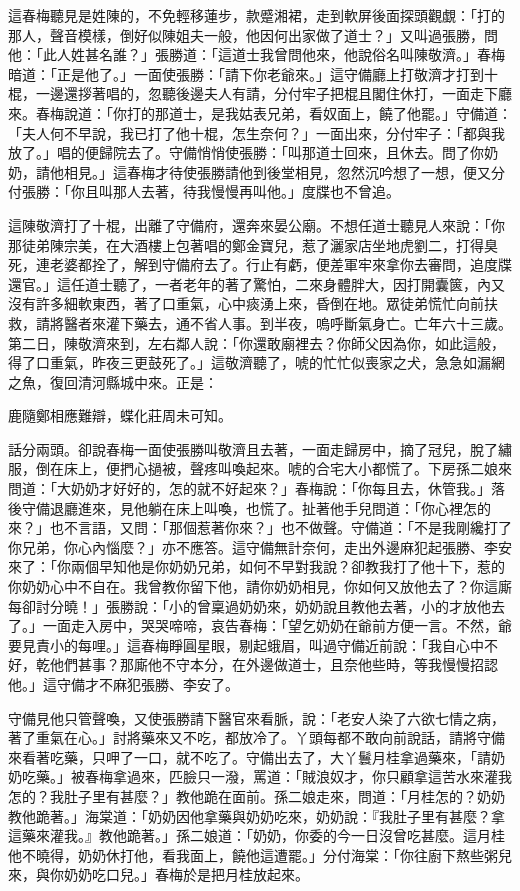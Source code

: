 這春梅聽見是姓陳的，不免輕移蓮步，款蹙湘裙，走到軟屏後面探頭觀覷：「打的那人，聲音模樣，倒好似陳姐夫一般，他因何出家做了道士？」又叫過張勝，問他：「此人姓甚名誰？」張勝道：「這道士我曾問他來，他說俗名叫陳敬濟。」春梅暗道：「正是他了。」一面使張勝：「請下你老爺來。」這守備廳上打敬濟才打到十棍，一邊還拶著唱的，忽聽後邊夫人有請，分付牢子把棍且閣住休打，一面走下廳來。春梅說道：「你打的那道士，是我姑表兄弟，看奴面上，饒了他罷。」守備道：「夫人何不早說，我已打了他十棍，怎生奈何？」一面出來，分付牢子：「都與我放了。」唱的便歸院去了。守備悄悄使張勝：「叫那道士回來，且休去。問了你奶奶，請他相見。」這春梅才待使張勝請他到後堂相見，忽然沉吟想了一想，便又分付張勝：「你且叫那人去著，待我慢慢再叫他。」度牒也不曾追。

這陳敬濟打了十棍，出離了守備府，還奔來晏公廟。不想任道士聽見人來說：「你那徒弟陳宗美，在大酒樓上包著唱的鄭金寶兒，惹了灑家店坐地虎劉二，打得臭死，連老婆都拴了，解到守備府去了。行止有虧，便差軍牢來拿你去審問，追度牒還官。」這任道士聽了，一者老年的著了驚怕，二來身體胖大，因打開囊篋，內又沒有許多細軟東西，著了口重氣，心中痰湧上來，昏倒在地。眾徒弟慌忙向前扶救，請將醫者來灌下藥去，通不省人事。到半夜，嗚呼斷氣身亡。亡年六十三歲。第二日，陳敬濟來到，左右鄰人說：「你還敢廟裡去？你師父因為你，如此這般，得了口重氣，昨夜三更鼓死了。」這敬濟聽了，唬的忙忙似喪家之犬，急急如漏網之魚，復回清河縣城中來。正是：

鹿隨鄭相應難辯，蝶化莊周未可知。

話分兩頭。卻說春梅一面使張勝叫敬濟且去著，一面走歸房中，摘了冠兒，脫了繡服，倒在床上，便捫心撾被，聲疼叫喚起來。唬的合宅大小都慌了。下房孫二娘來問道：「大奶奶才好好的，怎的就不好起來？」春梅說：「你每且去，休管我。」落後守備退廳進來，見他躺在床上叫喚，也慌了。扯著他手兒問道：「你心裡怎的來？」也不言語，又問：「那個惹著你來？」也不做聲。守備道：「不是我剛纔打了你兄弟，你心內惱麼？」亦不應答。這守備無計奈何，走出外邊麻犯起張勝、李安來了：「你兩個早知他是你奶奶兄弟，如何不早對我說？卻教我打了他十下，惹的你奶奶心中不自在。我曾教你留下他，請你奶奶相見，你如何又放他去了？你這廝每卻討分曉！」張勝說：「小的曾稟過奶奶來，奶奶說且教他去著，小的才放他去了。」一面走入房中，哭哭啼啼，哀告春梅：「望乞奶奶在爺前方便一言。不然，爺要見責小的每哩。」這春梅睜圓星眼，剔起蛾眉，叫過守備近前說：「我自心中不好，乾他們甚事？那廝他不守本分，在外邊做道士，且奈他些時，等我慢慢招認他。」這守備才不麻犯張勝、李安了。

守備見他只管聲喚，又使張勝請下醫官來看脈，說：「老安人染了六欲七情之病，著了重氣在心。」討將藥來又不吃，都放冷了。丫頭每都不敢向前說話，請將守備來看著吃藥，只呷了一口，就不吃了。守備出去了，大丫鬟月桂拿過藥來，「請奶奶吃藥。」被春梅拿過來，匹臉只一潑，罵道：「賊浪奴才，你只顧拿這苦水來灌我怎的？我肚子里有甚麼？」教他跪在面前。孫二娘走來，問道：「月桂怎的？奶奶教他跪著。」海棠道：「奶奶因他拿藥與奶奶吃來，奶奶說：『我肚子里有甚麼？拿這藥來灌我。』教他跪著。」孫二娘道：「奶奶，你委的今一日沒曾吃甚麼。這月桂他不曉得，奶奶休打他，看我面上，饒他這遭罷。」分付海棠：「你往廚下熬些粥兒來，與你奶奶吃口兒。」春梅於是把月桂放起來。

